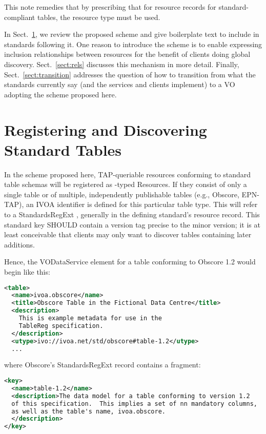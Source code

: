 \documentclass[11pt,a4paper]{ivoa}
\begin{document}
This note remedies that by prescribing that for resource records for
standard-compliant tables, the resource type 
must be used.

In Sect.~\ref{sect:norms}, we review the proposed scheme and give
boilerplate text to include in standards following it.  One reason to
introduce the scheme is to enable expressing inclusion relationships
between resources for the benefit of clients doing global discovery.
Sect.~\ref{sect:rels} discusses this mechanism in more detail.  Finally,
Sect.~\ref{sect:transition} addresses the question of how to transition
from what the standards currently say (and the services and clients
implement) to a VO adopting the scheme proposed here.

\section{Registering and Discovering Standard Tables}
\label{sect:norms}

In the scheme proposed here, TAP-queriable resources conforming to
standard table schemas will be registered as
-typed Resources.  If they consist of only a
single table or of multiple, independently publishable tables (e.g.,
Obscore, EPN-TAP), an IVOA identifier \citep{2016ivoa.spec.0523D} is
defined for this particular table type.  This will refer to a StandardsRegExt
\citep{2012ivoa.spec.0508H} , generally in the
defining standard's resource record.  This standard key SHOULD contain a
version tag precise to the minor version; it is at least conceivable
that clients may only want to discover tables containing later
additions.

Hence, the VODataService  element for a table conforming to
Obscore 1.2 would begin like this:
\begin{lstlisting}[language=XML]
<table>
  <name>ivoa.obscore</name>
  <title>Obscore Table in the Fictional Data Centre</title>
  <description>
    This is example metadata for use in the
    TableReg specification.
  </description>
  <utype>ivo://ivoa.net/std/obscore#table-1.2</utype>
  ...
\end{lstlisting}
where Obscore's StandardsRegExt record contains a fragment:
\begin{lstlisting}[language=XML]
<key>
  <name>table-1.2</name>
  <description>The data model for a table conforming to version 1.2
  of this specification.  This implies a set of nn mandatory columns,
  as well as the table's name, ivoa.obscore.
  </description>
</key>
\end{lstlisting}
\end{document}
